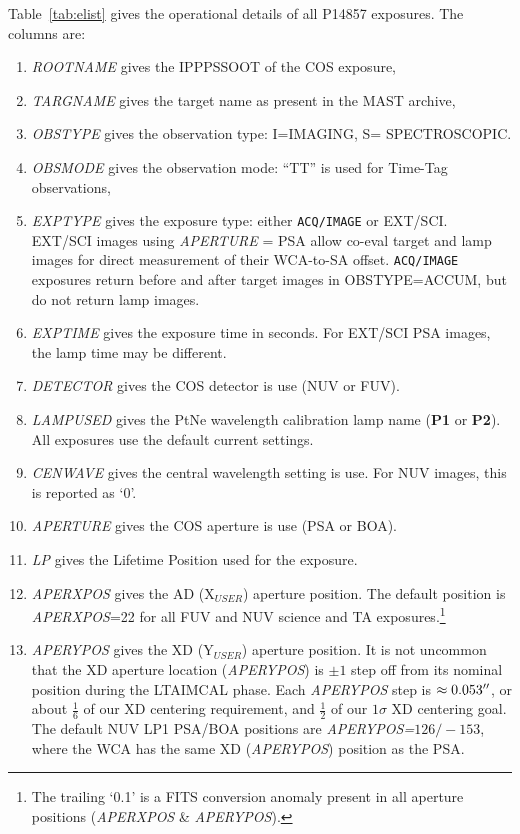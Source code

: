 \documentclass[12pt]{reportj}
\def\arcsec{\hbox{$^{\prime\prime}$}}
\newcommand{\plampone}{{\bf P1}}
\newcommand{\plamptwo}{{\bf P2}}
\newcommand{\pid}[1]{{\rm P}#1}
\newcommand{\fsw}[1]{\textsc{LTA#1}}
\newcommand{\tacq}[1]{\texttt{ACQ/#1}}
\begin{document}
Table~\ref{tab:elist} gives the operational details of all \pid{14857} exposures. The columns are:
\footnotesize
\begin{enumerate}
\item \textit{ROOTNAME} gives the IPPPSSOOT of the COS exposure,
\item \textit{TARGNAME} gives the target name as present in the MAST archive,
\item \textit{OBSTYPE} gives the observation type: I=IMAGING, S= SPECTROSCOPIC.
\item \textit{OBSMODE} gives the observation mode: ``TT'' is used for Time-Tag observations,
\item \textit{EXPTYPE} gives the exposure type: either \tacq{IMAGE} or EXT/SCI. EXT/SCI images using \textit{APERTURE} = PSA allow co-eval target and lamp images for direct measurement of their WCA-to-SA offset. \tacq{IMAGE} exposures return before and after target images in \textsc{OBSTYPE}=ACCUM, but do not return lamp images.
\item \textit{EXPTIME} gives the exposure time in seconds. For EXT/SCI PSA images, the lamp time may be different.
\item \textit{DETECTOR} gives the COS detector is use (NUV or FUV).
\item \textit{LAMPUSED} gives the PtNe wavelength calibration lamp name (\plampone{} or \plamptwo{}). All exposures use the default current settings.
\item \textit{CENWAVE} gives the central wavelength setting is use. For NUV images, this is reported as `0'.
\item \textit{APERTURE} gives the COS aperture is use (PSA or BOA).
\item \textit{LP} gives the Lifetime Position used for the exposure.
\item \textit{APERXPOS} gives the AD (X$_{USER}$) aperture position. The default position is \textit{APERXPOS}=22 for all FUV and NUV science and TA exposures.\footnote{The trailing `0.1' is a FITS conversion anomaly present in all aperture positions (\textit{APERXPOS} \& \textit{APERYPOS}).}
\item \textit{APERYPOS} gives the XD (Y$_{USER}$) aperture position. It is not uncommon that the XD aperture location (\textit{APERYPOS}) is $\pm 1$ step off from its nominal position during the \fsw{IMCAL} phase. Each \textit{APERYPOS} step is $\approx0.053\arcsec$, or about $\frac{1}{6}$ of
our XD centering requirement, and $\frac{1}{2}$ of our $1\sigma$ XD centering goal. The default NUV LP1 PSA/BOA positions are \textit{APERYPOS=$126/-153$}, where the WCA has the same XD (\textit{APERYPOS}) position as the PSA.

\end{enumerate}
\end{document}
